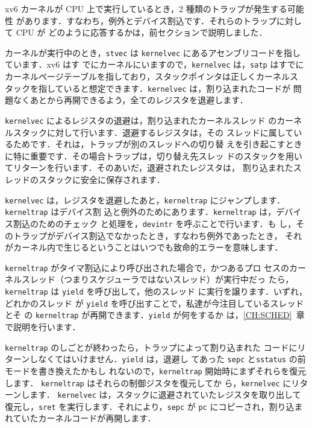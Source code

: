 xv6 カーネルが CPU 上で実行しているとき，2 種類のトラップが発生する可能性
があります．すなわち，例外とデバイス割込です．それらのトラップに対して CPU が
どのように応答するかは，前セクションで説明しました．

カーネルが実行中のとき，\texttt{stvec} は \texttt{kernelvec}
 にあるアセンブリコードを指しています．xv6 はす
でにカーネルにいますので，\texttt{kernelvec} は，\texttt{satp} はすでに
カーネルページテーブルを指しており，スタックポインタは正しくカーネルス
タックを指していると想定できます．\texttt{kernelvec} は，割り込まれたコードが
問題なくあとから再開できるよう，全てのレジスタを退避します．

\texttt{kernelvec} によるレジスタの退避は，割り込まれたカーネルスレッド
のカーネルスタックに対して行います．退避するレジスタは，その
スレッドに属しているためです．それは，トラップが別のスレッドへの切り替
えを引き起こすときに特に重要です．その場合トラップは，切り替え先スレッ
ドのスタックを用いてリターンを行います．そのあいだ，退避されたレジスタは，
割り込まれたスレッドのスタックに安全に保存されます．

\texttt{kernelvec} は，レジスタを退避したあと，\texttt{kerneltrap}
にジャンプします．\texttt{kerneltrap} はデバイス割
込と例外のためにあります．\texttt{kerneltrap} は，デバイス割込のためのチェック
と処理を，\texttt{devintr} 
を呼ぶことで行います．も
し，そのトラップがデバイス割込でなかったとき，すなわち例外であったとき，
それがカーネル内で生じるということはいつでも致命的エラーを意味します．

\texttt{kerneltrap} がタイマ割込により呼び出された場合で，かつあるプロ
セスのカーネルスレッド（つまりスケジューラではないスレッド）が実行中だっ
たら，\texttt{kerneltrap} は \texttt{yield} を呼び出して，他のスレッド
に実行を譲ります．いずれ，どれかのスレッド
が \texttt{yield} を呼び出すことで，私達が今注目しているスレッドとそ
の \texttt{kerneltrap} が再開できます．\texttt{yield} が何をするか
は，\ref{CH:SCHED}~章で説明を行います．

\texttt{kerneltrap} のしごとが終わったら，トラップによって割り込まれた
コードにリターンしなくてはいけません．\texttt{yield} は，退避し
てあった \texttt{sepc} と\texttt{sstatus} の前モードを書き換えたかもし
れないので，\texttt{kerneltrap} 開始時にまずそれらを復元します．
\texttt{kerneltrap} はそれらの制御ジスタを復元してか
ら，\texttt{kernelvec} 
にリターンします．
\texttt{kernelvec} は，スタックに退避されていたレジスタを取り出して
復元し，\texttt{sret} を実行します．それにより，\texttt{sepc} が
\texttt{pc} にコピーされ，割り込まれていたカーネルコードが再開します．

